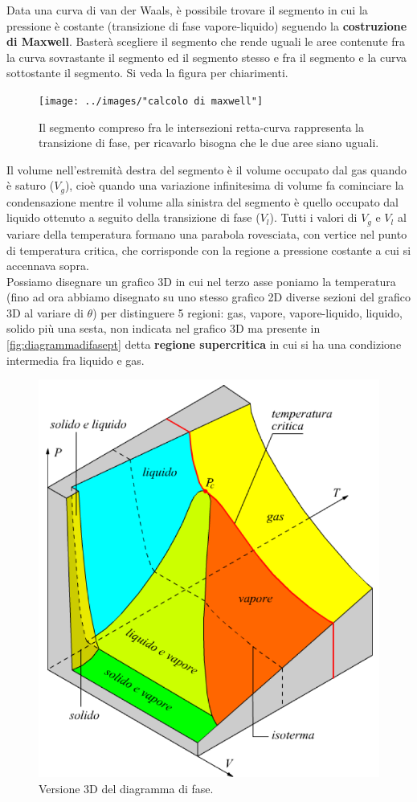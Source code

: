 \documentclass[10pt,a4paper]{article}
\begin{document}
\FloatBarrier
Data una curva di van der Waals, è possibile trovare il segmento in cui la pressione è costante (transizione di fase vapore-liquido) seguendo la \textbf{costruzione di Maxwell}. Basterà scegliere il segmento che rende uguali le aree contenute fra la curva sovrastante il segmento ed il segmento stesso e fra il segmento e la curva sottostante il segmento. Si veda la figura per chiarimenti.
\begin{figure}
	\centering
	\texttt{[image: ../images/"calcolo di maxwell"]}
	\caption{Il segmento compreso fra le intersezioni retta-curva rappresenta la transizione di fase, per ricavarlo bisogna che le due aree siano uguali.}
	\label{fig:calcolo-di-maxwell}
\end{figure}
\FloatBarrier
Il volume nell'estremità destra del segmento è il volume occupato dal gas quando è saturo ($V_g$), cioè quando una variazione infinitesima di volume fa cominciare la condensazione mentre il volume alla sinistra del segmento è quello occupato dal liquido ottenuto a seguito della transizione di fase ($V_l$). Tutti i valori di $V_g$ e $V_l$ al variare della temperatura formano una parabola rovesciata, con vertice nel punto di temperatura critica, che corrisponde con la regione a pressione costante a cui si accennava sopra. \\
Possiamo disegnare un grafico 3D in cui nel terzo asse poniamo la temperatura (fino ad ora abbiamo disegnato su uno stesso grafico 2D diverse sezioni del grafico 3D al variare di $\theta$) per distinguere 5 regioni: gas, vapore, vapore-liquido, liquido, solido più una sesta, non indicata nel grafico 3D ma presente in \ref{fig:diagrammadifasept} detta \textbf{regione supercritica} in cui si ha una condizione intermedia fra liquido e gas.  
\begin{figure}[h!]
	\centering
	\includegraphics[width=0.5\linewidth]{../images/diagrammadifase3D}
	\caption{Versione 3D del diagramma di fase.}
	\label{fig:diagrammadifase3d}
\end{figure}
\end{document}
